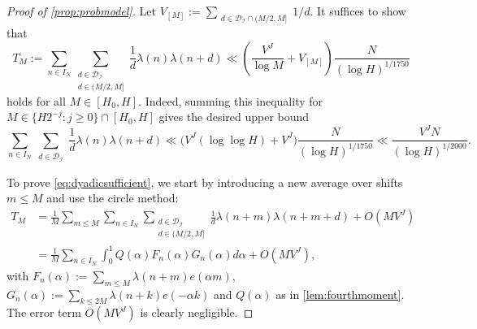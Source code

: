 \documentclass[11pt]{amsart}
\theoremstyle{definition}
\renewcommand{\leq}{\leqslant}
\renewcommand{\geq}{\geqslant}
\newcommand{\N}{I_N}
\newcommand{\D}{\mathcal{D}}
\newcommand{\curlyLpower}{V^{\repR}}
\newcommand{\indexset}{\mathcal{I}}
\newcommand{\repR}{J}
\newcommand{\otherK}{M}
\begin{document}
\begin{proof}[Proof of \cref{prop:probmodel}]
Let $V_{[\otherK]} :=\sum_{\substack{d\in \D_{\indexset}\cap (\otherK/2, \otherK]}}1/d$. It suffices to show that
\begin{equation}
\label{eq:dyadicsufficient}
 	T_{\otherK} := \sum_{n\in \N}  \sum_{\substack{d\in \D_{\indexset}\\ d\in (\otherK/2, \otherK]}}\frac{1}{d} \lambda(n) \lambda(n+d) \ll  \left(\frac{\curlyLpower}{\log \otherK}+V_{[\otherK]}\right) \frac{N}{(\log H)^{1/1750}}
\end{equation}
holds for all $\otherK\in [H_0, H]$. Indeed, summing this inequality for $\otherK\in  \{H2^{-j} : j\geq 0\}\cap [H_0, H]$ gives the desired upper bound 
\begin{equation*}
\sum_{n\in \N}  \sum_{\substack{d\in \D_{\indexset}}}\frac{1}{d} \lambda(n) \lambda(n+d) \ll \Big(\curlyLpower(\log \log H)+\curlyLpower \Big) \frac{N}{(\log H)^{1/1750}} \ll \frac{\curlyLpower N}{(\log H)^{1/2000}}.
\end{equation*}

To prove \cref{eq:dyadicsufficient}, we start by introducing a new average over shifts $m\leq \otherK$ and use the circle method:
\begin{align*}
	T_{\otherK} &= \frac{1}{\otherK} \sum_{m\leq \otherK} \sum_{n\in \N}   \sum_{\substack{d\in \D_{\indexset}\\ d\in (\otherK/2, \otherK]}}\frac{1}{d} \lambda(n+m) \lambda(n+m+d) + O(\otherK\curlyLpower)\\
	&= \frac{1}{\otherK} \sum_{n\in \N} \int_0^1 Q(\alpha) F_n(\alpha) G_n(\alpha) d\alpha + O(\otherK\curlyLpower),
\end{align*}
with $F_n(\alpha):=\sum_{m\leq \otherK}\lambda(n+m)e(\alpha m)$, $G_n(\alpha):=\sum_{k\leq 2\otherK}\lambda(n+k)e(-\alpha k)$ and $Q(\alpha)$ as in \cref{lem:fourthmoment}.
The error term $O(\otherK\curlyLpower)$ is clearly negligible. 


\end{proof}
\end{document}
